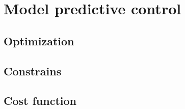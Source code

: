 \chapter{Model predictive control}
\label{ch:mpc}

\section{Optimization}
\label{section:optimization}
\section{Constrains}
\label{section:constrains}
\section{Cost function}
\label{section:costfunction}
%
%
%
%
%
%
%
